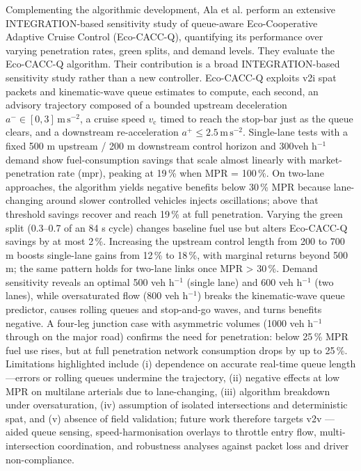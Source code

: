 Complementing the algorithmic development, Ala et al. \cite{Ala2016} perform an extensive INTEGRATION-based sensitivity study of queue-aware Eco-Cooperative Adaptive Cruise Control (Eco-CACC-Q), quantifying its performance over varying penetration rates, green splits, and demand levels. They evaluate the Eco-CACC-Q algorithm. Their contribution is a broad INTEGRATION-based sensitivity study rather than a new controller. Eco-CACC-Q exploits \ac{v2i} \ac{spat} packets and kinematic-wave queue estimates to compute, each second, an advisory trajectory composed of a bounded upstream deceleration $a^{-}\!\in[0,3]\,\mathrm{m\,s^{-2}}$, a cruise speed $v_{\mathrm c}$ timed to reach the stop-bar just as the queue clears, and a downstream re-acceleration $a^{+}\!\le 2.5\,\mathrm{m\,s^{-2}}$.  Single-lane tests with a fixed 500 m upstream / 200 m downstream control horizon and 300veh h$^{-1}$ demand show fuel-consumption savings that scale almost linearly with market-penetration rate (\ac{mpr}), peaking at 19\,\% when MPR = 100\,\%.  On two-lane approaches, the algorithm yields negative benefits below 30\,\% MPR because lane-changing around slower controlled vehicles injects oscillations; above that threshold savings recover and reach 19\,\% at full penetration. Varying the green split (0.3–0.7 of an 84 s cycle) changes baseline fuel use but alters Eco-CACC-Q savings by at most 2\,\%.  Increasing the upstream control length from 200 to 700 m boosts single-lane gains from 12\,\% to 18\,\%, with marginal returns beyond 500 m; the same pattern holds for two-lane links once MPR > 30\,\%. Demand sensitivity reveals an optimal 500 veh h$^{-1}$ (single lane) and 600 veh h$^{-1}$ (two lanes), while oversaturated flow (800 veh h$^{-1}$) breaks the kinematic-wave queue predictor, causes rolling queues and stop-and-go waves, and turns benefits negative. A four-leg junction case with asymmetric volumes (1000 veh h$^{-1}$ through on the major road) confirms the need for penetration: below 25\,\% MPR fuel use rises, but at full penetration network consumption drops by up to 25\,\%. Limitations highlighted include (i) dependence on accurate real-time queue length—errors or rolling queues undermine the trajectory, (ii) negative effects at low MPR on multilane arterials due to lane-changing, (iii) algorithm breakdown under oversaturation, (iv) assumption of isolated intersections and deterministic \ac{spat}, and (v) absence of field validation; future work therefore targets \ac{v2v} --- aided queue sensing, speed-harmonisation overlays to throttle entry flow, multi-intersection coordination, and robustness analyses against packet loss and driver non-compliance.
